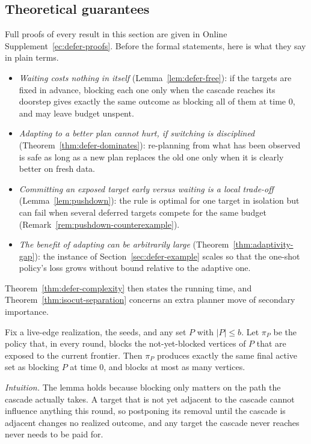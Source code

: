\documentclass[ijoc,sglanonrev]{informs4}
\begin{document}
\subsection{Theoretical guarantees}\label{sec:defer-theory}

Full proofs of every result in this section are given in
Online Supplement~\ref{ec:defer-proofs}. Before the formal statements, here
is what they say in plain terms.
\begin{itemize}
\item \emph{Waiting costs nothing in itself} (Lemma~\ref{lem:defer-free}):
  if the targets are fixed in advance, blocking each one only when the
  cascade reaches its doorstep gives exactly the same outcome as blocking
  all of them at time $0$, and may leave budget unspent.
\item \emph{Adapting to a better plan cannot hurt, if switching is
  disciplined} (Theorem~\ref{thm:defer-dominates}): re-planning from what
  has been observed is safe as long as a new plan replaces the old one only
  when it is clearly better on fresh data.
\item \emph{Committing an exposed target early versus waiting is a
  local trade-off} (Lemma~\ref{lem:pushdown}): the rule is optimal for one
  target in isolation but can fail when several deferred targets compete for
  the same budget (Remark~\ref{rem:pushdown-counterexample}).
\item \emph{The benefit of adapting can be arbitrarily large}
  (Theorem~\ref{thm:adaptivity-gap}): the instance of
  Section~\ref{sec:defer-example} scales so that the one-shot policy's
  loss grows without bound relative to the adaptive one.
\end{itemize}
Theorem~\ref{thm:defer-complexity} then states the running time, and
Theorem~\ref{thm:isocut-separation} concerns an extra planner move of
secondary importance.

\begin{lemma}\label{lem:defer-free}
Fix a live-edge realization, the seeds, and any set $P$ with $|P|\le b$. Let
$\pi_P$ be the policy that, in every round, blocks the not-yet-blocked
vertices of $P$ that are exposed to the current frontier. Then $\pi_P$
produces exactly the same final active set as blocking $P$ at time $0$, and
blocks at most as many vertices.
\end{lemma}

\emph{Intuition.} The lemma holds because blocking only matters on the
path the cascade actually takes. A target that is not yet adjacent to the
cascade cannot influence anything this round, so postponing its removal until
the cascade is adjacent changes no realized outcome, and any target the
cascade never reaches never needs to be paid for.
\end{document}
